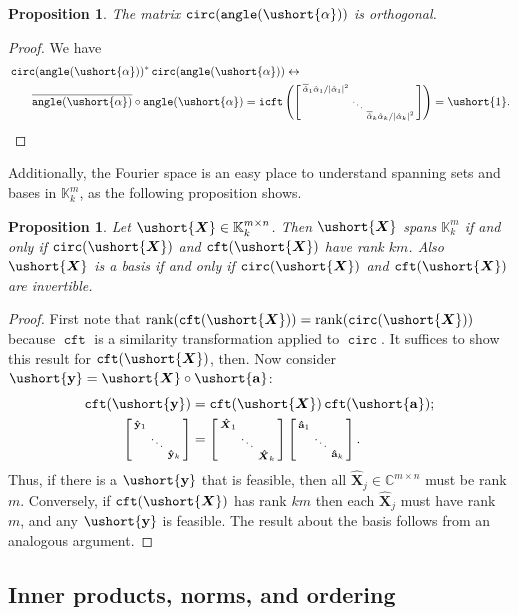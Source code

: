 \documentclass[1p,authoryear,letterpaper]{elsarticle}
\newtheorem{proposition}[theorem]{Proposition}
\DeclareMathOperator{\tcirc}{\texttt{circ}}
\DeclareMathOperator{\rank}{rank}\DeclareMathOperator{\diag}{diag}\DeclareMathOperator{\Diag}{Diag}\DeclareMathOperator{\supp}{supp}
\providecommand{\KK}{\mathbb{K}}
\providecommand{\CC}{\mathbb{C}}
\newcommand{\conj}[1]{\overline{#1}}
\providecommand{\sbmat}[1]{\left[\begin{smallmatrix} #1 \end{smallmatrix}\right]}
\providecommand{\mat}{\boldsymbol}
\renewcommand{\vec}{\mathbf}
\providecommand{\vhat}[1]{\ensuremath{\vec{\hat{#1}}}}
\DeclareMathOperator{\fft}{\texttt{cft}}
\DeclareMathOperator{\ifft}{\texttt{icft}}
\renewcommand{\circeq}{\leftrightarrow}
\newcommand{\cel}[1]{\ushort{#1}}
\newcommand{\celm}[1]{\cel{\mat{#1}}}
\newcommand{\celv}[1]{\cel{\vec{#1}}}
\newcommand{\calpha}{\ensuremath{\cel{\alpha}}}
\newcommand{\cone}{\ensuremath{\cel{1}}}
\newcommand{\cva}{\ensuremath{\celv{a}}}
\newcommand{\cvy}{\ensuremath{\celv{y}}}
\providecommand{\cmX}{\ensuremath{\celm{X}}}
\newcommand{\mXhat}{\mat{\hat{X}}}
\newcommand{\vyhat}{\vhat{y}}
\newcommand{\vahat}{\vhat{a}}
\DeclareMathOperator{\tangle}{\texttt{angle}}
\begin{document}
\begin{proposition}
The matrix $\tcirc(\tangle(\calpha))$ is orthogonal.
\end{proposition}
\begin{proof} We have
\[ \begin{aligned}
&   \tcirc(\tangle(\calpha))^* \tcirc(\tangle(\calpha))
 \circeq  \\
 & \qquad   \conj{\tangle(\calpha)} \circ \tangle(\calpha)
  =
    \ifft\left( \sbmat{
       \conj{\hat{\alpha}}_1 \hat{\alpha}_1/|\hat{\alpha}_1|^2 \\
       & \ddots
       \\ & & \conj{\hat{\alpha}}_k \hat{\alpha}_k/|\hat{\alpha}_k|^2 }
      \right)  = \cone.
\end{aligned} \]
\end{proof}
Additionally, the Fourier space is an easy place to understand
spanning sets and bases in $\KK_k^m$, as the following proposition shows.
\begin{proposition} \label{thm:basis}
Let $\cmX \in \KK_k^{m \times n}$. Then
$\cmX$ spans $\KK_k^m$ \emph{if and only if} $\tcirc(\cmX)$
and $\fft(\cmX)$ have rank $km$.  Also $\cmX$
is a basis \emph{if and only if} $\tcirc(\cmX)$
and $\fft(\cmX)$ are invertible.
\end{proposition}
\begin{proof}
First note that $\rank(\fft(\cmX)) = \rank(\tcirc(\cmX))$
because $\fft$ is a similarity transformation applied to $\tcirc$.
It suffices to show this result for $\fft(\cmX)$, then.  Now consider
$\cvy = \cmX \circ \cva$:
\[ \begin{aligned}
\fft(\cvy) & = \fft(\cmX) \fft(\cva) ; \\
\sbmat{\vyhat_1 \\ & \ddots \\ & & \vyhat_k}
& =
\sbmat{\mXhat_1 \\ & \ddots \\ & & \mXhat_k}
  \sbmat{\vahat_1 \\ & \ddots \\ & & \vahat_k}.
\end{aligned} \]
Thus, if there is a $\cvy$
that is feasible, then all $\mXhat_j \in \CC^{m \times n}$ must be rank $m$.
Conversely, if $\fft(\cmX)$ has rank $km$
then each $\mXhat_j$ must have rank $m$, and any $\cvy$
is feasible.  The result about the basis follows
from an analogous argument.
\end{proof}

\subsection{Inner products, norms, and ordering}
\label{sec:triangle}
\end{document}
